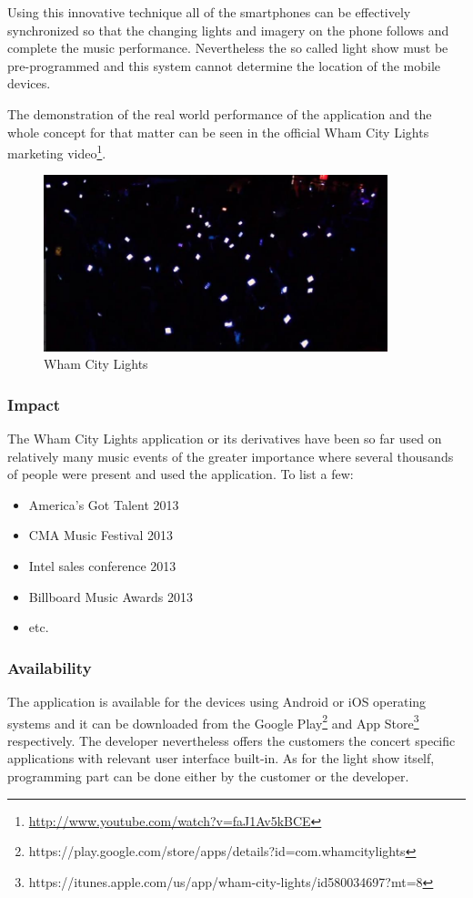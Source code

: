 Using this innovative technique all of the smartphones can be effectively synchronized so that the  changing lights and imagery on the phone follows and complete the music performance.
Nevertheless the so called light show must be pre-programmed and this system cannot determine the location of the mobile devices.

The demonstration of the real world performance of the application and the whole concept for that matter can be seen in the official Wham City Lights marketing video\footnote{\url{http://www.youtube.com/watch?v=faJ1Av5kBCE}}.

\begin{figure}[!ht]
	\centering
		\includegraphics[width=10cm]{preliminaryStudies/wham_city_lights.jpg}
	\caption{Wham City Lights}
	\label{fig:wham_city_lights}
\end{figure}

\subsubsection{Impact}
The Wham City Lights application or its derivatives have been so far used on relatively many music events of the greater importance where several thousands of people were present and used the application. To list a few:
\begin{itemize}
\item America's Got Talent 2013
\item CMA Music Festival 2013
\item Intel sales conference 2013
\item Billboard Music Awards 2013
\item etc.
\end{itemize}

\subsubsection{Availability}
The application is available for the devices using Android or iOS operating systems and it can be downloaded from the Google Play\footnote{https://play.google.com/store/apps/details?id=com.whamcitylights} and App Store\footnote{https://itunes.apple.com/us/app/wham-city-lights/id580034697?mt=8} respectively. The developer nevertheless offers the customers the concert specific applications with relevant user interface built-in. As for the light show itself, programming part can be done either by the customer or the developer.


